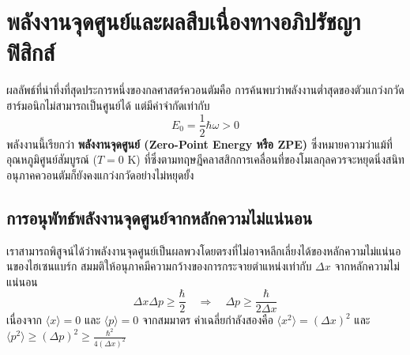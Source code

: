 \section{พลังงานจุดศูนย์และผลสืบเนื่องทางอภิปรัชญาฟิสิกส์}
\label{sec_zpe_vacuum}

ผลลัพธ์ที่น่าทึ่งที่สุดประการหนึ่งของกลศาสตร์ควอนตัมคือ การค้นพบว่าพลังงานต่ำสุดของตัวแกว่งกวัดฮาร์มอนิกไม่สามารถเป็นศูนย์ได้ แต่มีค่าจำกัดเท่ากับ
\begin{equation}
E_0 = \frac{1}{2}\hbar\omega > 0
\end{equation}
พลังงานนี้เรียกว่า \textbf{พลังงานจุดศูนย์ (Zero-Point Energy หรือ ZPE)} ซึ่งหมายความว่าแม้ที่อุณหภูมิศูนย์สัมบูรณ์ ($T = 0\text{ K}$) ที่ซึ่งตามทฤษฎีคลาสสิกการเคลื่อนที่ของโมเลกุลควรจะหยุดนิ่งสนิท อนุภาคควอนตัมก็ยังคงแกว่งกวัดอย่างไม่หยุดยั้ง

\subsection{การอนุพัทธ์พลังงานจุดศูนย์จากหลักความไม่แน่นอน}
เราสามารถพิสูจน์ได้ว่าพลังงานจุดศูนย์เป็นผลพวงโดยตรงที่ไม่อาจหลีกเลี่ยงได้ของหลักความไม่แน่นอนของไฮเซนแบร์ก สมมติให้อนุภาคมีความกว้างของการกระจายตำแหน่งเท่ากับ $\Delta x$ จากหลักความไม่แน่นอน
\begin{equation}
\Delta x \Delta p \ge \frac{\hbar}{2} \quad \Longrightarrow \quad \Delta p \ge \frac{\hbar}{2\Delta x}
\end{equation}
เนื่องจาก $\langle x \rangle = 0$ และ $\langle p \rangle = 0$ จากสมมาตร ค่าเฉลี่ยกำลังสองคือ $\langle x^2 \rangle = (\Delta x)^2$ และ $\langle p^2 \rangle \ge (\Delta p)^2 \ge \frac{\hbar^2}{4(\Delta x)^2}$

